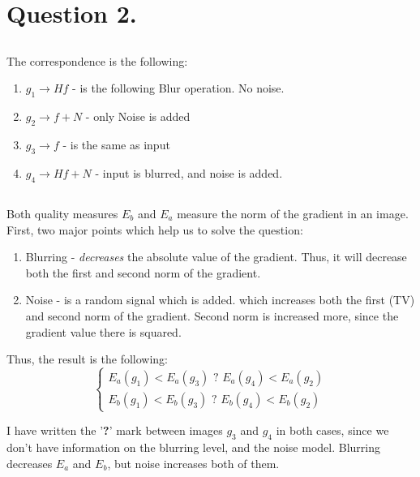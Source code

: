 \documentclass[a4paper]{iacas}
\begin{document}
\newpage
\section{Question 2.}
\subsection{}
The correspondence is the following:
\begin{enumerate}
\item $g_{1} \rightarrow Hf$ - is the following Blur operation. No noise.
\item $g_{2} \rightarrow f + N$ - only Noise is added
\item $g_{3} \rightarrow f$ - is the same as input
\item $g_{4} \rightarrow Hf + N$ - input is blurred, and noise is added.
\end{enumerate}


\subsection{}
Both quality measures $E_b$ and $E_a$ measure the norm of the gradient in an image. First, two major points which help us to solve the question:
\begin{enumerate}
\item Blurring - \textit{decreases} the absolute value of the gradient. Thus, it will decrease both the first and second norm of the gradient.
\item Noise - is a random signal which is added. which increases both the first (TV) and second norm of the gradient. Second norm is increased more, since the gradient value there is squared.
\end{enumerate}

Thus, the result is the following:
\begin{equation*}
\begin{cases}
E_{a}(g_{1}) < E_{a}(g_{3}) \textbf{ ? } E_{a}(g_{4}) < E_{a}(g_{2})  \\
E_{b}(g_{1}) < E_{b}(g_{3}) \textbf{ ? } E_{b}(g_{4}) < E_{b}(g_{2}) 
\end{cases}
\end{equation*}

I have written the '\textbf{?}' mark between images $g_{3}$ and $g_{4}$ in both cases, since we don't have information on the blurring level, and the noise model. Blurring decreases $E_{a}$ and $E_{b}$, but noise increases both of them.
\end{document}
